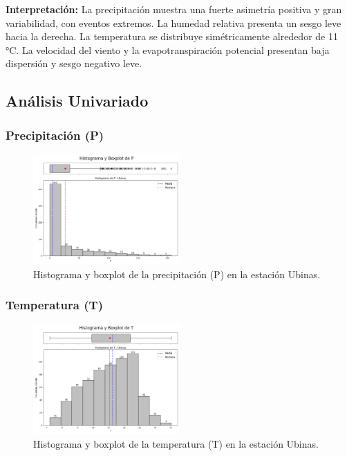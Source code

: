 \textbf{Interpretación:} La precipitación muestra una fuerte asimetría positiva y gran variabilidad, con eventos extremos. La humedad relativa presenta un sesgo leve hacia la derecha. La temperatura se distribuye simétricamente alrededor de 11 °C. La velocidad del viento y la evapotranspiración potencial presentan baja dispersión y sesgo negativo leve.

\subsection{Análisis Univariado}

\subsubsection*{Precipitación (P)}
\begin{figure}[H]
\centering
\includegraphics[width=0.5\textwidth]{resultados/por_estacion_meteorologica/Ubinas/P_histograma.png}
\caption{Histograma y boxplot de la precipitación (P) en la estación Ubinas.}
\label{fig:ubinas_P}
\end{figure}

\subsubsection*{Temperatura (T)}
\begin{figure}[H]
\centering
\includegraphics[width=0.5\textwidth]{resultados/por_estacion_meteorologica/Ubinas/T_histograma.png}
\caption{Histograma y boxplot de la temperatura (T) en la estación Ubinas.}
\label{fig:ubinas_T}
\end{figure}

